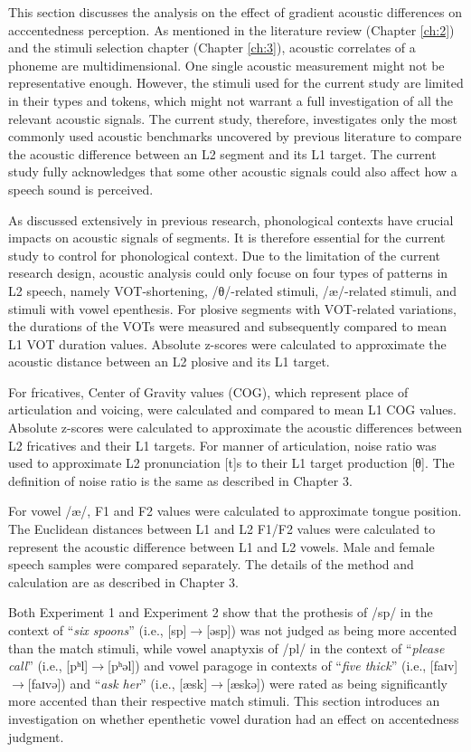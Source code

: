 This section discusses the analysis on the effect of gradient acoustic differences on acccentedness perception. As mentioned in the literature review (Chapter \ref{ch:2}) and the stimuli selection chapter (Chapter \ref{ch:3}), acoustic correlates of a phoneme are multidimensional. One single acoustic measurement might not be representative enough. However, the stimuli used for the current study are limited in their types and tokens, which might not warrant a full investigation of all the relevant acoustic signals. The current study, therefore, investigates only the most commonly used acoustic benchmarks uncovered by previous literature to compare the acoustic difference between an L2 segment and its L1 target. The current study fully acknowledges that some other acoustic signals could also affect how a speech sound is perceived.

As discussed extensively in previous research, phonological contexts have crucial impacts on acoustic signals of segments. It is therefore essential for the current study to control for phonological context. Due to the limitation of the current research design, acoustic analysis could only focuse on four types of patterns in L2 speech, namely VOT-shortening, /θ/-related stimuli, /æ/-related stimuli, and stimuli with vowel epenthesis. For plosive segments with VOT-related variations, the durations of the VOTs were measured and subsequently compared to mean L1 VOT duration values. Absolute z-scores were calculated to approximate the acoustic distance between an L2 plosive and its L1 target. 

For fricatives, Center of Gravity values (COG), which represent place of articulation and voicing, were calculated and compared to mean L1 COG values. Absolute z-scores were calculated to approximate the acoustic differences between L2 fricatives and their L1 targets. For manner of articulation, noise ratio was used to approximate L2 pronunciation [t]s to their L1 target production [θ]. The definition of noise ratio is the same as described in Chapter 3. 

For vowel /æ/, F1 and F2 values were calculated to approximate tongue position. The Euclidean distances between L1 and L2 F1/F2 values were calculated to represent the acoustic difference between L1 and L2 vowels. Male and female speech samples were compared separately. The details of the method and calculation are as described in Chapter 3. 

Both Experiment 1 and Experiment 2 show that the prothesis of /sp/ in the context of “\textit{six spoons}” (i.e., [sp]$\rightarrow$[əsp]) was not judged as being more accented than the match stimuli, while vowel anaptyxis of /pl/ in the context of “\textit{please call}” (i.e., [pʰl]$\rightarrow$[pʰəl]) and vowel paragoge in contexts of “\textit{five thick}” (i.e., [faɪv]$\rightarrow$[faɪvə]) and “\textit{ask her}” (i.e., [æsk]$\rightarrow$[æskə]) were rated as being significantly more accented than their respective match stimuli. This section introduces an investigation on whether epenthetic vowel duration had an effect on accentedness judgment. 

